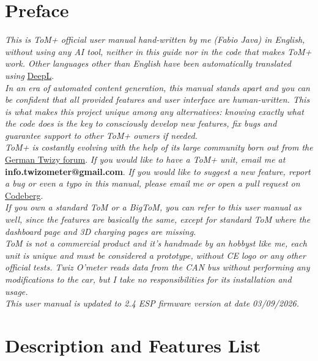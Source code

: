\chapter*{Preface}

\textit{This is ToM+ official user manual hand-written by me (Fabio Java) in English, without using
any AI tool, neither in this guide nor in the code that makes ToM+ work. Other languages
other than English have been automatically translated using} \href{https://www.deepl.com/en/translator}{DeepL}.\\

\textit{In an era of automated content generation, this manual stands apart and you can
be confident that all provided features and user interface are human-written.
This is what makes this project unique among any alternatives: knowing exactly
what the code does is the key to consciously develop new features, fix bugs and
guarantee support to other ToM+ owners if needed.}\\

\textit{ToM+ is costantly evolving with the help of its large community born out from
the} \href{https://www.twizy-forum.de/twiz-o-meter}{German Twizy forum}. \textit{If you 
would like to have a ToM+ unit, email me at} \textbf{info.twizometer@gmail.com}.
\textit{If you would like to suggest a new feature, report a bug or even a typo in this
manual, please email me or open a pull request on} \href{https://codeberg.org/fabio-java/ToM-Wizard}{Codeberg}.\\

\textit{If you own a standard ToM or a BigToM, you can refer to this user manual as well,
since the features are basically the same, except for standard ToM where the dashboard
page and 3D charging pages are missing.}\\

\textit{ToM is not a commercial product and it's handmade by an hobbyst like me, each 
unit is unique and must be considered a prototype, without CE logo or any other 
official tests. Twiz O'meter reads data from the CAN bus without performing any
modifications to the car, but I take no responsibilities for its installation
and usage.}\\

\textit{This user manual is updated to 2.4 ESP firmware version at date 03/09/2026.}


\chapter{Description and Features List}

